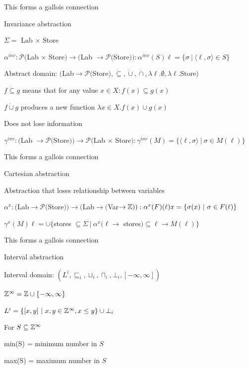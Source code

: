 			\item This forms a gallois connection
		\enumend
		\item Invariance abstraction
		\enumstart
			\item $\Sigma =$ Lab $\times$ Store
			\item $\alpha^{inv}: \mathcal{P}($Lab $\times$ Store$) \rightarrow ($Lab $\rightarrow \mathcal{P}($Store$)): \alpha^{inv}(S)\ell = \{\sigma \ | \ \langle \ell, \sigma \rangle \in S\}$
			\item Abstract domain: $($Lab$ \rightarrow \mathcal{P}($Store$), \dot \subseteq, \dot \cup, \dot \cap, \lambda \ell.\emptyset, \lambda \ell.$Store$)$
			\item $f \dot \subseteq g$ means that for any value $x \in X: f(x) \subseteq g(x)$
			\item $f \dot \cup g$ produces a new function $\lambda x \in X. f(x) \cup g(x)$
			\item Does not lose information
			\item $\gamma^{inv}: ($Lab $\rightarrow \mathcal{P}($Store$)) \rightarrow \mathcal{P}($Lab $\times$ Store$): \gamma^{inv}(M) = \{\langle \ell, \sigma \rangle \ | \ \sigma \in M(\ell)\}$
			\item This forms a gallois connection
		\enumend
		\item Cartesian abstraction
		\enumstart
			\item Abstraction that loses relationship between variables
			\item $\alpha^x: ($Lab$ \rightarrow \mathcal{P}($Store$)) \rightarrow ($Lab$ \rightarrow ($Var$ \rightarrow \mathbb{Z})): \alpha^x(F)(\ell)x = \{\sigma(x) \ | \ \sigma \in F(\ell)\}$
			\item $\gamma^x(M)\ell = \cup \{$stores $\subseteq \Sigma \ | \ \alpha^x(\ell \rightarrow $ stores$) \subseteq \ell \rightarrow M(\ell)\}$
			\item This forms a gallois connection
		\enumend
		\item Interval abstraction
		\enumstart
			\item Interval domain: $(L^i, \sqsubseteq_i, \sqcup_i, \sqcap_i, \bot_i, [-\infty, \infty])$
			\item $\mathbb{Z}^\infty = \mathbb{Z} \cup \{-\infty, \infty\}$
			\item $L^i = \{[x,y] \ | \ x,y \in \mathbb{Z}^\infty, x \le y\} \cup \bot_i$
			\item For $S \subseteq \mathbb{Z}^\infty$
			\enumstart
				\item min(S) = minimum number in $S$
				\item max(S) = maximum number in $S$
